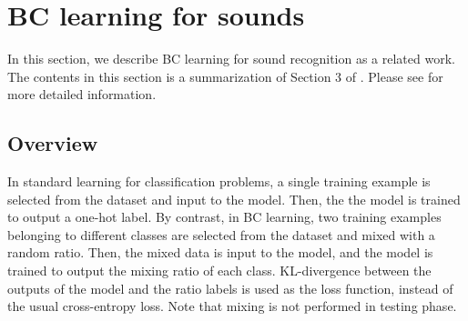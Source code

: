 \documentclass[10pt,twocolumn,letterpaper]{article}
\begin{document}

\section{BC learning for sounds}\label{2}
In this section, we describe BC learning for sound recognition \cite{tokozume2018learning} as a related work. The contents in this section is a summarization of Section 3 of \cite{tokozume2018learning}. Please see \cite{tokozume2018learning} for more detailed information.  

\subsection{Overview}
In standard learning for classification problems, a single training example is selected from the dataset and input to the model. Then, the the model is trained to output a one-hot label. By contrast, in BC learning, two training examples belonging to different classes are selected from the dataset and mixed with a random ratio. Then, the mixed data is input to the model, and the model is trained to output the mixing ratio of each class. KL-divergence between the outputs of the model and the ratio labels is used as the loss function, instead of the usual cross-entropy loss. Note that mixing is not performed in testing phase.

\end{document}
